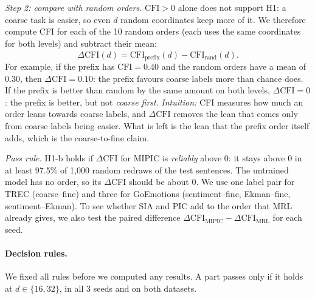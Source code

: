 \begin{itemize}
  \emph{Step 2: compare with random orders.}
  $\text{CFI}>0$ alone does not support H1: a coarse task is easier, so even $d$ random coordinates keep more of it.
  We therefore compute CFI for each of the 10 random orders (each uses the same coordinates for both levels) and subtract their mean:
  \[
    \Delta\text{CFI}(d)=\text{CFI}_{\text{prefix}}(d)-\overline{\text{CFI}}_{\text{rand}}(d).
  \]
  For example, if the prefix has $\text{CFI}=0.40$ and the random orders have a mean of $0.30$, then $\Delta\text{CFI}=0.10$: the prefix favours coarse labels more than chance does.
  If the prefix is better than random by the same amount on both levels, $\Delta\text{CFI}=0$: the prefix is better, but not \emph{coarse first}.
  \emph{Intuition:} CFI measures how much an order leans towards coarse labels, and $\Delta\text{CFI}$ removes the lean that comes only from coarse labels being easier.
  What is left is the lean that the prefix order itself adds, which is the coarse-to-fine claim.

  \emph{Pass rule.}
  H1-b holds if $\Delta\text{CFI}$ for MIPIC is \emph{reliably} above 0: it stays above 0 in at least 97.5\% of 1,000 random redraws of the test sentences.
  The untrained model has no order, so its $\Delta$CFI should be about 0.
  We use one label pair for TREC (coarse--fine) and three for GoEmotions (sentiment--fine, Ekman--fine, sentiment--Ekman).
  To see whether SIA and PIC add to the order that MRL already gives, we also test the paired difference $\Delta\text{CFI}_{\text{MIPIC}}-\Delta\text{CFI}_{\text{MRL}}$ for each seed.
\end{itemize}

\paragraph{Decision rules.}
We fixed all rules before we computed any results.
A part passes only if it holds at $d\in\{16,32\}$, in all 3 seeds and on both datasets.

